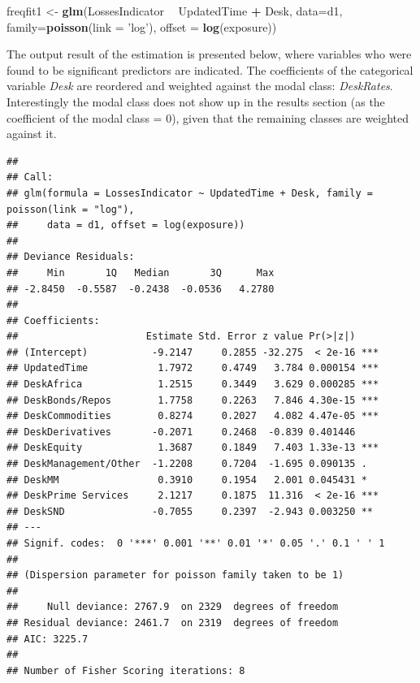 \documentclass[]{article}
\newenvironment{Shaded}{\begin{snugshade}}{\end{snugshade}}
\newcommand{\KeywordTok}[1]{\textcolor[rgb]{0.13,0.29,0.53}{\textbf{#1}}}
\newcommand{\DataTypeTok}[1]{\textcolor[rgb]{0.13,0.29,0.53}{#1}}
\newcommand{\StringTok}[1]{\textcolor[rgb]{0.31,0.60,0.02}{#1}}
\newcommand{\OperatorTok}[1]{\textcolor[rgb]{0.81,0.36,0.00}{\textbf{#1}}}
\newcommand{\NormalTok}[1]{#1}
\begin{document}
\singlespacing

\begin{Shaded}
\begin{Highlighting}[]
\NormalTok{freqfit1 <-}\StringTok{ }\KeywordTok{glm}\NormalTok{(LossesIndicator }\OperatorTok{~}\StringTok{ }\NormalTok{UpdatedTime }\OperatorTok{+}\StringTok{ }\NormalTok{Desk, }\DataTypeTok{data=}\NormalTok{d1, }
               \DataTypeTok{family=}\KeywordTok{poisson}\NormalTok{(}\DataTypeTok{link =} \StringTok{'log'}\NormalTok{), }\DataTypeTok{offset =} \KeywordTok{log}\NormalTok{(exposure))}
\end{Highlighting}
\end{Shaded}

\doublespacing

The output result of the estimation is presented below, where variables
who were found to be significant predictors are indicated. The
coefficients of the categorical variable \emph{Desk} are reordered and
weighted against the modal class: \emph{DeskRates}. Interestingly the
modal class does not show up in the results section (as the coefficient
of the modal class = \(0\)), given that the remaining classes are
weighted against it.

\singlespacing

\begin{verbatim}
## 
## Call:
## glm(formula = LossesIndicator ~ UpdatedTime + Desk, family = poisson(link = "log"), 
##     data = d1, offset = log(exposure))
## 
## Deviance Residuals: 
##     Min       1Q   Median       3Q      Max  
## -2.8450  -0.5587  -0.2438  -0.0536   4.2780  
## 
## Coefficients:
##                      Estimate Std. Error z value Pr(>|z|)    
## (Intercept)           -9.2147     0.2855 -32.275  < 2e-16 ***
## UpdatedTime            1.7972     0.4749   3.784 0.000154 ***
## DeskAfrica             1.2515     0.3449   3.629 0.000285 ***
## DeskBonds/Repos        1.7758     0.2263   7.846 4.30e-15 ***
## DeskCommodities        0.8274     0.2027   4.082 4.47e-05 ***
## DeskDerivatives       -0.2071     0.2468  -0.839 0.401446    
## DeskEquity             1.3687     0.1849   7.403 1.33e-13 ***
## DeskManagement/Other  -1.2208     0.7204  -1.695 0.090135 .  
## DeskMM                 0.3910     0.1954   2.001 0.045431 *  
## DeskPrime Services     2.1217     0.1875  11.316  < 2e-16 ***
## DeskSND               -0.7055     0.2397  -2.943 0.003250 ** 
## ---
## Signif. codes:  0 '***' 0.001 '**' 0.01 '*' 0.05 '.' 0.1 ' ' 1
## 
## (Dispersion parameter for poisson family taken to be 1)
## 
##     Null deviance: 2767.9  on 2329  degrees of freedom
## Residual deviance: 2461.7  on 2319  degrees of freedom
## AIC: 3225.7
## 
## Number of Fisher Scoring iterations: 8
\end{verbatim}
\end{document}
